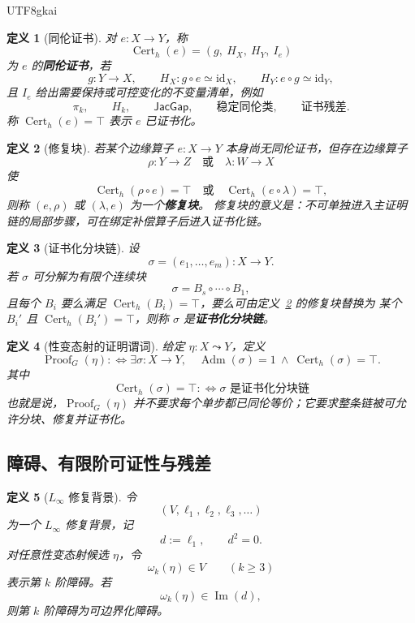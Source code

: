 \documentclass[12pt]{article}
\newtheorem{definition}{定义}[section]
\newcommand{\Linfty}{\ensuremath{L_\infty}}
\newcommand{\Layer}{\ell}
\newcommand{\Imop}{\operatorname{Im}}
\newcommand{\id}{\mathrm{id}}
\newcommand{\Adm}{\operatorname{Adm}}
\newcommand{\Cert}{\operatorname{Cert}}
\newcommand{\Proof}{\operatorname{Proof}}
\newcommand{\JacGap}{\mathsf{JacGap}}
\begin{document}
\begin{CJK*}{UTF8}{gkai}
\begin{definition}[同伦证书]
\label{def:tex50-homotopy-certificate}
对 $e:X\to Y$，称
\[
  \Cert_h(e)
  =
  (g,\ H_X,\ H_Y,\ I_e)
\]
为 $e$ 的\textbf{同伦证书}，若
\[
  g:Y\to X,\qquad
  H_X:g\circ e\simeq\id_X,\qquad
  H_Y:e\circ g\simeq\id_Y,
\]
且 $I_e$ 给出需要保持或可控变化的不变量清单，例如
\[
  \pi_k,\qquad H_k,\qquad \JacGap,\qquad \text{稳定同伦类},\qquad \text{证书残差}.
\]
称 $\Cert_h(e)=\top$ 表示 $e$ 已证书化。
\end{definition}

\begin{definition}[修复块]
\label{def:tex50-repair-block}
若某个边缘算子 $e:X\to Y$ 本身尚无同伦证书，但存在边缘算子
\[
  \rho:Y\to Z
  \quad\text{或}\quad
  \lambda:W\to X
\]
使
\[
  \Cert_h(\rho\circ e)=\top
  \quad\text{或}\quad
  \Cert_h(e\circ\lambda)=\top,
\]
则称 $(e,\rho)$ 或 $(\lambda,e)$ 为一个\textbf{修复块}。
修复块的意义是：不可单独进入主证明链的局部步骤，可在绑定补偿算子后进入证书化链。
\end{definition}

\begin{definition}[证书化分块链]
\label{def:tex50-certified-block-chain}
设
\[
  \sigma=(e_1,\dots,e_m):X\to Y.
\]
若 $\sigma$ 可分解为有限个连续块
\[
  \sigma=B_s\circ\cdots\circ B_1,
\]
且每个 $B_i$ 要么满足 $\Cert_h(B_i)=\top$，要么可由定义~\ref{def:tex50-repair-block} 的修复块替换为
某个 $B_i'$ 且 $\Cert_h(B_i')=\top$，则称 $\sigma$ 是\textbf{证书化分块链}。
\end{definition}

\begin{definition}[性变态射的证明谓词]
给定 $\eta:X\leadsto Y$，定义
\[
  \Proof_G(\eta)
  :\Longleftrightarrow
  \exists \sigma:X\to Y,\quad
  \Adm(\sigma)=1\ \wedge\
  \Cert_h(\sigma)=\top.
\]
其中
\[
  \Cert_h(\sigma)=\top
  :\Longleftrightarrow
  \sigma\text{ 是证书化分块链}
\]
也就是说，$\Proof_G(\eta)$ 并不要求每个单步都已同伦等价；它要求整条链被可允许分块、修复并证书化。
\end{definition}

\subsection{障碍、有限阶可证性与残差}
\label{subsec:tex50-obstruction}

\begin{definition}[\texorpdfstring{$L_\infty$}{L-infinity} 修复背景]
令
\[
  (V,\Layer_1,\Layer_2,\Layer_3,\dots)
\]
为一个 \Linfty{} 修复背景，记
\[
  d:=\Layer_1,\qquad d^2=0.
\]
对任意性变态射候选 $\eta$，令
\[
  \omega_k(\eta)\in V
  \qquad(k\ge 3)
\]
表示第 $k$ 阶障碍。若
\[
  \omega_k(\eta)\in\Imop(d),
\]
则第 $k$ 阶障碍为可边界化障碍。
\end{definition}


\end{CJK*}
\end{document}
